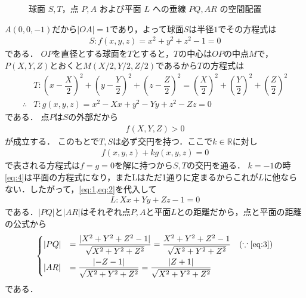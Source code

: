 \documentclass[../../main.tex]{subfiles}
\begin{document}
\begin{figure}[htb]
  \caption{球面 $S, T$，点 $P, A$ および平面 $L$ への垂線 $PQ, AR$ の空間配置}
  \label{fig:spheres_plane_orthogonal_projection_3d}
\end{figure}

$A(0,0,-1)$だから$|OA|=1$であり，よって球面$S$は半径$1$でその方程式は
\begin{align}
  S: f(x,y,z) = x^2+y^2+z^2 - 1 = 0 \label{eq:1}
\end{align}
である．
$OP$を直径とする球面を$T$とすると，$T$の中心は$OP$の中点$M$で，$P(X,Y,Z)$とおくと$M(X/2,Y/2,Z/2)$であるから$T$の方程式は
\begin{align}
  & T:\left(x-\dfrac{X}{2}\right)^2 + \left(y-\dfrac{Y}{2}\right)^2
  +\left(z-\dfrac{Z}{2}\right)^2
  = \left(\dfrac{X}{2}\right)^2 + \left(\dfrac{Y}{2}\right)^2 + \left(\dfrac{Z}{2}\right)^2 \\
  \therefore
  & T: g(x,y,z) = x^2-Xx+y^2-Yy+z^2-Zz=0 \label{eq:2}
\end{align}
である．
点$P$は$S$の外部だから
\begin{align}
  f(X,Y,Z)>0 \label{eq:3}
\end{align}
が成立する．
このもとで$T,S$は必ず交円を持つ．ここで$k\in\mathbb R$に対し
\begin{align}
  f(x,y,z)+kg(x,y,z)=0 \label{eq:4}
\end{align}
で表される方程式は$f=g=0$を解に持つから$S,T$の交円を通る．
$k=-1$の時\cref{eq:4}は平面の方程式になり，またLはただ1通りに定まるからこれが$L$に他ならない．したがって，\cref{eq:1,eq:2}を代入して
\begin{align}
  L:Xx+Yy+Zz-1=0 \label{eq:5}
\end{align}
である．$|PQ|$と$|AR|$はそれぞれ点$P, A$と平面$L$との距離だから，点と平面の距離の公式から
\begin{align}
  \begin{dcases}
    |PQ|&=\dfrac{|X^2+Y^2+Z^2-1|}{\sqrt{X^2+Y^2+Z^2}}
    =\dfrac{X^2+Y^2+Z^2-1}{\sqrt{X^2+Y^2+Z^2}}\quad(\because\text{\cref{eq:3}})\\
    |AR|&=\dfrac{|{-Z-1}|}{\sqrt{X^2+Y^2+Z^2}}=\dfrac{|Z+1|}{\sqrt{X^2+Y^2+Z^2}}
  \end{dcases}
\end{align}
である．
\end{document}
